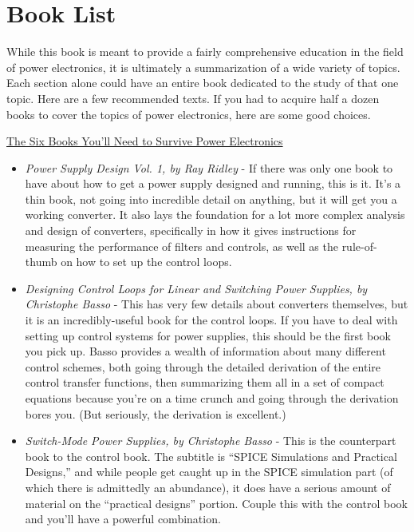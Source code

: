 \section{Book List}

While this book is meant to provide a fairly comprehensive education in the field of power electronics, it is ultimately a summarization of a wide variety of topics. Each section alone could have an entire book dedicated to the study of that one topic. Here are a few recommended texts. If you had to acquire half a dozen books to cover the topics of power electronics, here are some good choices.

\underline{The Six Books You'll Need to Survive Power Electronics}

\begin{itemize}
\item \emph{Power Supply Design Vol. 1, by Ray Ridley} - If there was only one book to have about how to get a power supply designed and running, this is it. It's a thin book, not going into incredible detail on anything, but it will get you a working converter. It also lays the foundation for a lot more complex analysis and design of converters, specifically in how it gives instructions for measuring the performance of filters and controls, as well as the rule-of-thumb on how to set up the control loops.

\item \emph{Designing Control Loops for Linear and Switching Power Supplies, by Christophe Basso} - This has very few details about converters themselves, but it is an incredibly-useful book for the control loops. If you have to deal with setting up control systems for power supplies, this should be the first book you pick up. Basso provides a wealth of information about many different control schemes, both going through the detailed derivation of the entire control transfer functions, then summarizing them all in a set of compact equations because you're on a time crunch and going through the derivation bores you. (But seriously, the derivation is excellent.)

\item \emph{Switch-Mode Power Supplies, by Christophe Basso} - This is the counterpart book to the control book. The subtitle is ``SPICE Simulations and Practical Designs,'' and while people get caught up in the SPICE simulation part (of which there is admittedly an abundance), it does have a serious amount of material on the ``practical designs'' portion. Couple this with the control book and you'll have a powerful combination.


\end{itemize}
